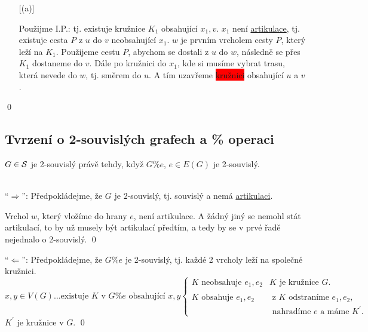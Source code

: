 \begin{enumerate} [(a)]
\begin{figure}[H]
    \end{figure}
    Použijme I.P.: tj. existuje kružnice $K_1$ obsahující $x_1, v$. $x_1$ není \hyperref[artikulace]{artikulace}, tj. 
    existuje cesta $P$ z $u$ do $v$ neobsahující $x_1$. $w$ je prvním vrcholem cesty $P$, který leží na $K_1$. Použijeme
    cestu $P$, abychom se dostali z $u$ do $w$, následně se přes $K_1$ dostaneme do $v$. Dále po kružnici do $x_1$, kde 
    si musíme vybrat trasu, která nevede do $w$, tj. směrem do $u$. A tím uzavřeme \colorbox{red}{kružnici} obsahující 
    $u$ a $v$.
\end{enumerate}
\hspace{\fill}\qed

\subsection{Tvrzení o 2-souvislých grafech a \% operaci}
$G \in \S$ je 2-souvislý právě tehdy, když $G \% e$, $e \in E(G)$ je 2-souvislý.

\\
\enquote{$\Rightarrow$}: Předpokládejme, že $G$ je 2-souvislý, tj. souvislý a nemá \hyperref[artikulace]{artikulaci}.

Vrchol $w$, který vložíme do hrany $e$, není artikulace. A žádný jiný se nemohl stát artikulací, to by už musely být 
artikulací předtím, a tedy by se v prvé řadě nejednalo o 2-souvislý.
\hspace{\fill}\qed

\enquote{$\Leftarrow$}: Předpokládejme, že $G \% e$ je 2-souvislý, tj. každé 2 vrcholy leží na společné kružnici.
\[
    x, y \in V(G) \dots \text{existuje } K \text{ v } G \% e \text{ obsahující } x, y
    \begin{cases}
        K \text{ neobsahuje } e_1, e_2 & K \text{ je kružnice } G. \\
        \\
        K \text{ obsahuje } e_1, e_2 & \text{ z } K \text{ odstraníme } e_1, e_2, \\ 
        & \text{ nahradíme } e \text{ a máme } K^\prime.
    \end{cases}
\]
$K^\prime$ je kružnice v $G$. 
\hspace{\fill}\qed

